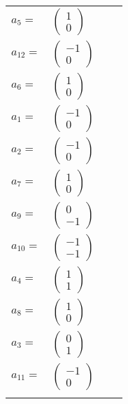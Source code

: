 \documentclass[1p]{elsarticle_modified}
\theoremstyle{definition}
\begin{document}
\begin{tabular}{m{7pt} m{180pt} m{7pt} m{180pt} }
\flushright $a_{5}=$&$\begin{pmatrix}1\\0\end{pmatrix}$ \\
\flushright $a_{12}=$&$\begin{pmatrix}-1\\0\end{pmatrix}$ \\
\flushright $a_{6}=$&$\begin{pmatrix}1\\0\end{pmatrix}$ \\
\flushright $a_{1}=$&$\begin{pmatrix}-1\\0\end{pmatrix}$ \\
\flushright $a_{2}=$&$\begin{pmatrix}-1\\0\end{pmatrix}$ \\
\flushright $a_{7}=$&$\begin{pmatrix}1\\0\end{pmatrix}$ \\
\flushright $a_{9}=$&$\begin{pmatrix}0\\-1\end{pmatrix}$ \\
\flushright $a_{10}=$&$\begin{pmatrix}-1\\-1\end{pmatrix}$ \\
\flushright $a_{4}=$&$\begin{pmatrix}1\\1\end{pmatrix}$ \\
\flushright $a_{8}=$&$\begin{pmatrix}1\\0\end{pmatrix}$ \\
\flushright $a_{3}=$&$\begin{pmatrix}0\\1\end{pmatrix}$ \\
\flushright $a_{11}=$&$\begin{pmatrix}-1\\0\end{pmatrix}$\\&\end{tabular}
\end{document}
